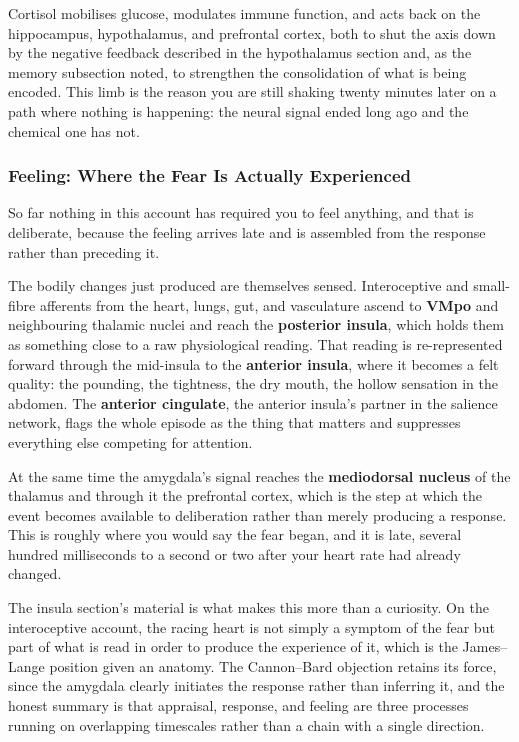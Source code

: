 \documentclass[11pt]{article}
\begin{document}
Cortisol mobilises glucose, modulates immune function, and acts back on the hippocampus, hypothalamus, and prefrontal cortex, both to shut the axis down by the negative feedback described in the hypothalamus section and, as the memory subsection noted, to strengthen the consolidation of what is being encoded. This limb is the reason you are still shaking twenty minutes later on a path where nothing is happening: the neural signal ended long ago and the chemical one has not.

\subsubsection{Feeling: Where the Fear Is Actually Experienced}

So far nothing in this account has required you to feel anything, and that is deliberate, because the feeling arrives late and is assembled from the response rather than preceding it.

The bodily changes just produced are themselves sensed. Interoceptive and small-fibre afferents from the heart, lungs, gut, and vasculature ascend to \textbf{VMpo} and neighbouring thalamic nuclei and reach the \textbf{posterior insula}, which holds them as something close to a raw physiological reading. That reading is re-represented forward through the mid-insula to the \textbf{anterior insula}, where it becomes a felt quality: the pounding, the tightness, the dry mouth, the hollow sensation in the abdomen. The \textbf{anterior cingulate}, the anterior insula's partner in the salience network, flags the whole episode as the thing that matters and suppresses everything else competing for attention.

At the same time the amygdala's signal reaches the \textbf{mediodorsal nucleus} of the thalamus and through it the prefrontal cortex, which is the step at which the event becomes available to deliberation rather than merely producing a response. This is roughly where you would say the fear began, and it is late, several hundred milliseconds to a second or two after your heart rate had already changed.

The insula section's material is what makes this more than a curiosity. On the interoceptive account, the racing heart is not simply a symptom of the fear but part of what is read in order to produce the experience of it, which is the James--Lange position given an anatomy. The Cannon--Bard objection retains its force, since the amygdala clearly initiates the response rather than inferring it, and the honest summary is that appraisal, response, and feeling are three processes running on overlapping timescales rather than a chain with a single direction.
\end{document}
